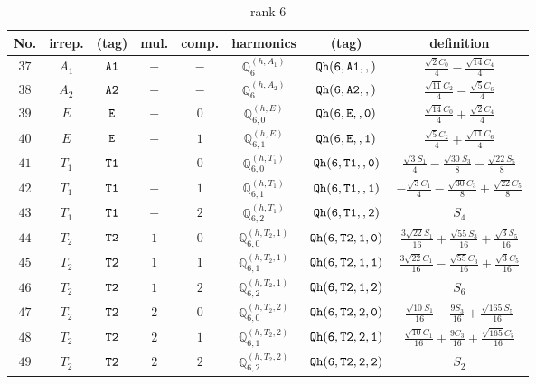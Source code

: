 \documentclass[fleqn,8pt]{jsarticle}
\begin{document}
\begin{table}[ht!]
\begin{center}
\caption{rank 6}
\renewcommand{\arraystretch}{1.3}
\begin{tabular}{cccccccc} \hline \hline
No. & irrep. & (tag) & mul. & comp. & harmonics & (tag) & definition \\ \hline
$ 37 $ & $ A_{1} $ & $ {\tt A1} $ & $ - $ & $ - $ & $ \mathbb{Q}_{6}^{(h,A_{1})} $ & $ {\tt Qh(6,A1,,)} $ & $ \frac{\sqrt{2} C_{0}}{4} - \frac{\sqrt{14} C_{4}}{4} $ \\
$ 38 $ & $ A_{2} $ & $ {\tt A2} $ & $ - $ & $ - $ & $ \mathbb{Q}_{6}^{(h,A_{2})} $ & $ {\tt Qh(6,A2,,)} $ & $ \frac{\sqrt{11} C_{2}}{4} - \frac{\sqrt{5} C_{6}}{4} $ \\
$ 39 $ & $ E $ & $ {\tt E} $ & $ - $ & $ 0 $ & $ \mathbb{Q}_{6,0}^{(h,E)} $ & $ {\tt Qh(6,E,,0)} $ & $ \frac{\sqrt{14} C_{0}}{4} + \frac{\sqrt{2} C_{4}}{4} $ \\
$ 40 $ & $ E $ & $ {\tt E} $ & $ - $ & $ 1 $ & $ \mathbb{Q}_{6,1}^{(h,E)} $ & $ {\tt Qh(6,E,,1)} $ & $ \frac{\sqrt{5} C_{2}}{4} + \frac{\sqrt{11} C_{6}}{4} $ \\
$ 41 $ & $ T_{1} $ & $ {\tt T1} $ & $ - $ & $ 0 $ & $ \mathbb{Q}_{6,0}^{(h,T_{1})} $ & $ {\tt Qh(6,T1,,0)} $ & $ \frac{\sqrt{3} S_{1}}{4} - \frac{\sqrt{30} S_{3}}{8} - \frac{\sqrt{22} S_{5}}{8} $ \\
$ 42 $ & $ T_{1} $ & $ {\tt T1} $ & $ - $ & $ 1 $ & $ \mathbb{Q}_{6,1}^{(h,T_{1})} $ & $ {\tt Qh(6,T1,,1)} $ & $ - \frac{\sqrt{3} C_{1}}{4} - \frac{\sqrt{30} C_{3}}{8} + \frac{\sqrt{22} C_{5}}{8} $ \\
$ 43 $ & $ T_{1} $ & $ {\tt T1} $ & $ - $ & $ 2 $ & $ \mathbb{Q}_{6,2}^{(h,T_{1})} $ & $ {\tt Qh(6,T1,,2)} $ & $ S_{4} $ \\
$ 44 $ & $ T_{2} $ & $ {\tt T2} $ & $ 1 $ & $ 0 $ & $ \mathbb{Q}_{6,0}^{(h,T_{2},1)} $ & $ {\tt Qh(6,T2,1,0)} $ & $ \frac{3 \sqrt{22} S_{1}}{16} + \frac{\sqrt{55} S_{3}}{16} + \frac{\sqrt{3} S_{5}}{16} $ \\
$ 45 $ & $ T_{2} $ & $ {\tt T2} $ & $ 1 $ & $ 1 $ & $ \mathbb{Q}_{6,1}^{(h,T_{2},1)} $ & $ {\tt Qh(6,T2,1,1)} $ & $ \frac{3 \sqrt{22} C_{1}}{16} - \frac{\sqrt{55} C_{3}}{16} + \frac{\sqrt{3} C_{5}}{16} $ \\
$ 46 $ & $ T_{2} $ & $ {\tt T2} $ & $ 1 $ & $ 2 $ & $ \mathbb{Q}_{6,2}^{(h,T_{2},1)} $ & $ {\tt Qh(6,T2,1,2)} $ & $ S_{6} $ \\
$ 47 $ & $ T_{2} $ & $ {\tt T2} $ & $ 2 $ & $ 0 $ & $ \mathbb{Q}_{6,0}^{(h,T_{2},2)} $ & $ {\tt Qh(6,T2,2,0)} $ & $ \frac{\sqrt{10} S_{1}}{16} - \frac{9 S_{3}}{16} + \frac{\sqrt{165} S_{5}}{16} $ \\
$ 48 $ & $ T_{2} $ & $ {\tt T2} $ & $ 2 $ & $ 1 $ & $ \mathbb{Q}_{6,1}^{(h,T_{2},2)} $ & $ {\tt Qh(6,T2,2,1)} $ & $ \frac{\sqrt{10} C_{1}}{16} + \frac{9 C_{3}}{16} + \frac{\sqrt{165} C_{5}}{16} $ \\
$ 49 $ & $ T_{2} $ & $ {\tt T2} $ & $ 2 $ & $ 2 $ & $ \mathbb{Q}_{6,2}^{(h,T_{2},2)} $ & $ {\tt Qh(6,T2,2,2)} $ & $ S_{2} $ \\
 \hline \hline
\end{tabular}
\end{center}
\end{table}
\end{document}
